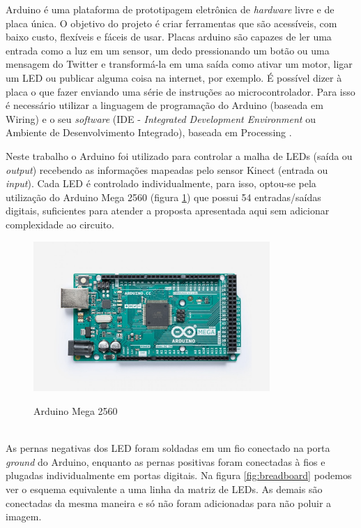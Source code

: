\begin{citacao}
Arduino é uma plataforma de prototipagem eletrônica de \textit{hardware} livre e de placa única. O objetivo do projeto é criar ferramentas que são acessíveis, com baixo custo, flexíveis e fáceis de usar. Placas arduino são capazes de ler uma entrada como a luz em um sensor, um dedo pressionando um botão ou uma mensagem do Twitter e transformá-la em uma saída como ativar um motor, ligar um LED ou publicar alguma coisa na internet, por exemplo. É possível dizer à placa o que fazer enviando uma série de instruções ao microcontrolador. Para isso é necessário utilizar a linguagem de programação do Arduino (baseada em Wiring) e o seu \textit{software} (IDE - \textit{Integrated Development Environment} ou Ambiente de Desenvolvimento Integrado), baseada em Processing \cite{arduino}. 
\end{citacao}

Neste trabalho o Arduino foi utilizado para controlar a malha de LEDs (saída ou \textit{output}) recebendo as informações mapeadas pelo sensor Kinect (entrada ou \textit{input}). Cada LED é controlado individualmente, para isso, optou-se pela utilização do Arduino Mega 2560 (figura \ref{fig:arduino}) que possui 54 entradas/saídas digitais, suficientes para atender a proposta apresentada aqui sem adicionar complexidade ao circuito.

\begin{figure}[H]
    \centering
    \caption{Arduino Mega 2560}
	\vspace*{0,2cm}
    \includegraphics[width=0.8\textwidth]{./04-figuras/arduino}
    \label{fig:arduino}
\end{figure}
\vspace*{-0,9cm}
{\raggedright {}}\\

As pernas negativas dos LED foram soldadas em um fio conectado na porta \textit{ground} do Arduino, enquanto as pernas positivas foram conectadas à fios e plugadas individualmente em portas digitais. Na figura \ref{fig:breadboard} podemos ver o esquema equivalente a uma linha da matriz de LEDs. As demais são conectadas da mesma maneira e só não foram adicionadas para não poluir a imagem.

